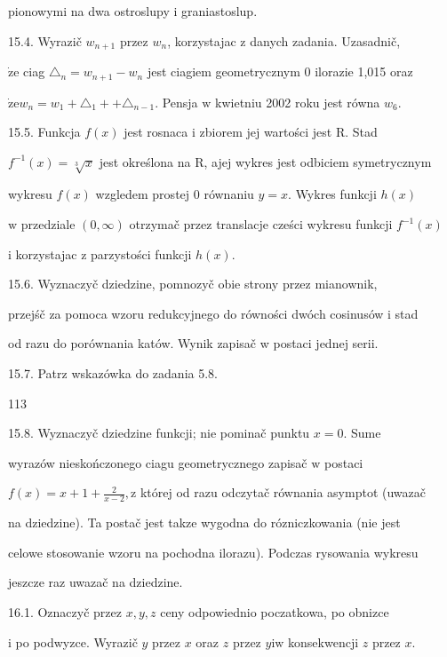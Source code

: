 \documentclass[a4paper,12pt]{article}
\begin{document}
pionowymi na dwa ostroslupy i graniastoslup.

15.4. Wyrazič $w_{n+1}$ przez $w_{n}$, korzystajac $\mathrm{z}$ danych zadania. Uzasadnič,

$\dot{\mathrm{z}}\mathrm{e}$ ciag $\triangle_{n}=w_{n+1}-w_{n}$ jest ciagiem geometrycznym $0$ ilorazie 1,015 oraz

$\dot{\mathrm{z}}\mathrm{e}w_{n}=w_{1}+\triangle_{1}+ +\triangle_{n-1}$. Pensja $\mathrm{w}$ kwietniu 2002 roku jest równa $w_{6}.$

15.5. Funkcja $f(x)$ jest rosnaca $\mathrm{i}$ zbiorem jej wartości jest R. Stad

$f^{-1}(x)=\sqrt[3]{x}$ jest określona na $\mathrm{R}$, ajej wykres jest odbiciem symetrycznym

wykresu $f(x)$ wzgledem prostej $0$ równaniu $y = x$. Wykres funkcji $h(x)$

$\mathrm{w}$ przedziale $(0,\infty)$ otrzymač przez translacje cześci wykresu funkcji $f^{-1}(x)$

$\mathrm{i}$ korzystajac $\mathrm{z}$ parzystości funkcji $h(x).$

15.6. Wyznaczyč dziedzine, pomnozyč obie strony przez mianownik,

przejśč za pomoca wzoru redukcyjnego do równości dwóch cosinusów i stad

od razu do porównania katów. Wynik zapisač w postaci jednej serii.

15.7. Patrz wskazówka do zadania 5.8.





113

15.8. Wyznaczyč dziedzine funkcji; nie pominač punktu $x=0$. Sume

wyrazów nieskończonego ciagu geometrycznego zapisač $\mathrm{w}$ postaci

$f(x)=x+1+\displaystyle \frac{2}{x-2}, \mathrm{z}$ której od razu odczytač równania asymptot (uwazač

na dziedzine). Ta postač jest takze wygodna do rózniczkowania (nie jest

celowe stosowanie wzoru na pochodna ilorazu). Podczas rysowania wykresu

jeszcze raz uwazač na dziedzine.

16.1. Oznaczyč przez $x, y, z$ ceny odpowiednio poczatkowa, po obnizce

$\mathrm{i}$ po podwyzce. Wyrazič $y$ przez $x$ oraz $z$ przez $y\mathrm{i}\mathrm{w}$ konsekwencji $z$ przez $x.$
\end{document}
